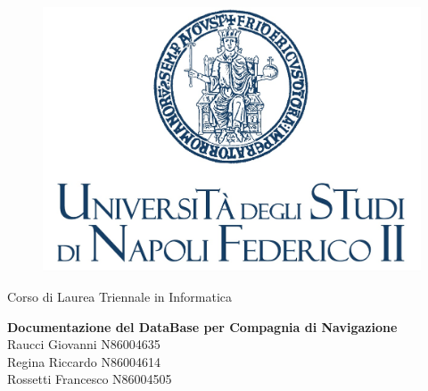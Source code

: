 \begin{titlepage}
\begin{figure}[!htb]
    \centering
    \includegraphics[keepaspectratio=true, width=0.5\linewidth]{immagini/Federico_II.jpg}
\end{figure}

\begin{center}
    \vspace{10mm}
    \LARGE{Corso di Laurea Triennale in Informatica}
\end{center}

\vspace{10mm}
\begin{center}
    \LARGE{\bf{Documentazione del DataBase per Compagnia di Navigazione\\}}
    \vspace{20mm}
    \Large{Raucci Giovanni N86004635\\}
    \Large{Regina Riccardo N86004614\\}
    \Large{Rossetti Francesco N86004505\\}
\end{center}


\vspace{30mm}


\hrulefill
\\

\end{titlepage}